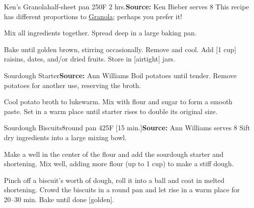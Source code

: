 \begin{recipe}{Ken's Granola}{half-sheet pan \hfill 250\0F \hfill 2 hrs.}{\textbf{Source:} Ken Bieber \hfill serves 8}
 \freeform [CB] This recipe has different proportions to \hyperref[Granola]{Granola}; perhaps you prefer it!

 Mix all ingredients together. Spread \inch deep in a large baking pan.

 \newstep Bake until golden brown, stirring occasionally. Remove and cool. Add [1 cup] raisins, dates, and/or dried fruits. Store in [airtight] jars.
\end{recipe}

\begin{recipe}{Sourdough Starter}{}{\textbf{Source:} Ann Williams \hfill }
 Boil potatoes until tender. Remove potatoes for another use, reserving the broth.

 Cool potato broth to lukewarm. Mix with flour and sugar to form a smooth paste. Set in a warm place until starter rises to double its original size.
\end{recipe}

\begin{recipe}{Sourdough Biscuits}{8\inch round pan \hfill 425\0F \hfill [15 min.]}{\textbf{Source:} Ann Williams \hfill serves 8}
 Sift dry ingredients into a large mixing bowl.

 Make a well in the center of the flour and add the sourdough starter and shortening. Mix well, adding more flour (up to 1 cup) to make a stiff dough.

 Pinch off a biscuit's worth of dough, roll it into a ball and coat in melted shortening. Crowd the biscuits in a round pan and let rise in a warm place for 20--30 min. Bake until done [golden].
\end{recipe}

